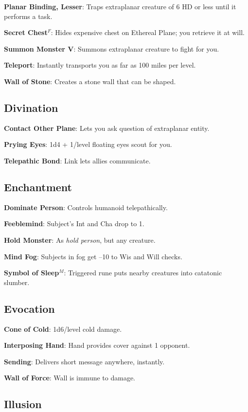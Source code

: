\textbf{Planar Binding, Lesser}: Traps extraplanar creature of 6 HD or less until it performs a task.

\textbf{Secret Chest}\(^{F}\): Hides expensive chest on Ethereal Plane; you retrieve it at will.

\textbf{Summon Monster V}: Summons extraplanar creature to fight for you.

\textbf{Teleport}: Instantly transports you as far as 100 miles per level.

\textbf{Wall of Stone}: Creates a stone wall that can be shaped.

\subsection{Divination}


\textbf{Contact Other Plane}: Lets you ask question of extraplanar entity.

\textbf{Prying Eyes}: 1d4 + 1/level floating eyes scout for you.

\textbf{Telepathic Bond}: Link lets allies communicate.

\subsection{Enchantment}


\textbf{Dominate Person}: Controls humanoid telepathically.

\textbf{Feeblemind}: Subject's Int and Cha drop to 1.

\textbf{Hold Monster}: As \textit{hold person}, but any creature.

\textbf{Mind Fog}: Subjects in fog get --10 to Wis and Will checks.

\textbf{Symbol of Sleep}\(^{M}\): Triggered rune puts nearby creatures into catatonic slumber.

\subsection{Evocation}


\textbf{Cone of Cold}: 1d6/level cold damage.

\textbf{Interposing Hand}: Hand provides cover against 1 opponent.

\textbf{Sending}: Delivers short message anywhere, instantly.

\textbf{Wall of Force}: Wall is immune to damage.

\subsection{Illusion}


